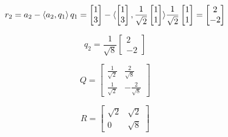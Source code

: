 \[ 
    r_2 = a_2 - \left\langle a_2, q_1\right\rangle q_1 
    = 
    \begin{bmatrix} 1 \\ 3 \end{bmatrix}
    - 
    \langle  
    \begin{bmatrix} 1 \\ 3 \end{bmatrix}
    ,
    \frac{1}{\sqrt{2}} \begin{bmatrix} 1 \\ 1 \end{bmatrix}
    \rangle    
    \frac{1}{\sqrt{2}} 
    \begin{bmatrix} 1 \\ 1 \end{bmatrix}
    = 
    \begin{bmatrix}
        2 \\ -2 
    \end{bmatrix}
\]

\[
    q_2 =
    \frac{1}{\sqrt{8}}
    \begin{bmatrix}
        2 \\ -2 
    \end{bmatrix}
\]

\[
    Q = 
    \begin{bmatrix}
        \frac{1}{\sqrt{2}} & \frac{2}{\sqrt{8}} \\
        \frac{1}{\sqrt{2}} & -\frac{2}{\sqrt{8}}
    \end{bmatrix}
\]

\[
    R =
    \begin{bmatrix}
        \sqrt{2} & \sqrt{2} \\
        0    &    \sqrt{8}
    \end{bmatrix}
\]

